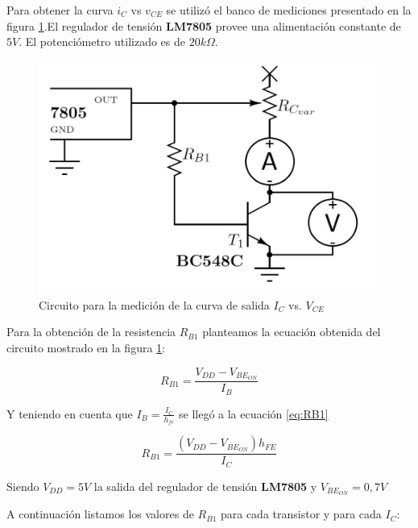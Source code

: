 \documentclass[10pt,spanish,a4paper,openany,notitlepage]{article}
\begin{document}
Para obtener la curva $i_C$ vs $v_{CE}$ se utilizó el banco de mediciones presentado en la figura \ref{circuito:medicion_salida}.El regulador de tensión \textbf{LM7805} provee una alimentación constante de $5\unit{V}$. El potenciómetro utilizado es de $20 \unit{k\Omega}$.

\begin{figure}[H] %
\begin{center}
\includegraphics[scale=0.2]{./imagenes/ic_vce.jpg}
\caption{Circuito para la medición de la curva de salida $I_C$ vs. $V_{CE}$}
 \label{circuito:medicion_salida}
\end{center}
\end{figure}

Para la obtención de la resistencia $R_{B1}$ planteamos la ecuación obtenida del circuito mostrado en la figura \ref{circuito:medicion_salida}:

\[ \displaystyle R_{B1} = \frac{V_{DD} - V_{BE_{ON}}}{I_B} \]


Y teniendo en cuenta que $I_B = \frac{I_C}{h_{fe}}$ se llegó a la ecuación \ref{eq:RB1}

\begin{equation}
R_{B1} = \frac{(V_{DD} - V_{BE_{ON}}) h_{FE}}{I_C}
\label{eq:RB1}
\end{equation}

Siendo $V_{DD} = 5 \unit{V}$ la salida del regulador de tensión  \textbf{LM7805} y $V_{BE_{ON}} = 0,7 \unit{V}$

A continuación listamos los valores de $R_{B1}$ para cada transistor y para cada $I_C$:
\end{document}
